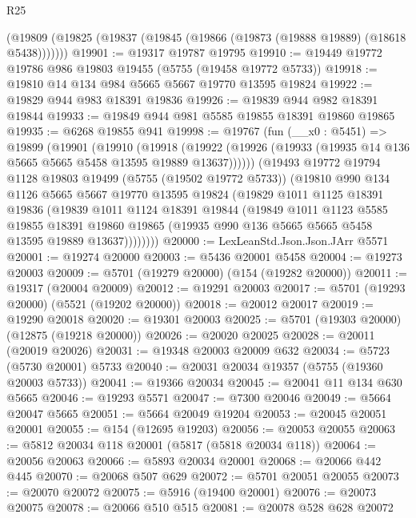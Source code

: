 \begin{lexlean}{R25}
\begin{coremodule}
    (@19809 (@19825 (@19837 (@19845 (@19866 (@19873 (@19888 @19889) (@18618 @5438)))))))
@19901 := @19317 @19787 @19795
@19910 := @19449 @19772 @19786 @986 @19803 @19455 (@5755 (@19458 @19772 @5733))
@19918 := @19810 @14 @134 @984 @5665 @5667 @19770 @13595 @19824
@19922 := @19829 @944 @983 @18391 @19836
@19926 := @19839 @944 @982 @18391 @19844
@19933 := @19849 @944 @981 @5585 @19855 @18391 @19860 @19865
@19935 := @6268 @19855 @941
@19998 := @19767
    (fun (__x0 : @5451) =>
    @19899
      (@19901
        (@19910
          (@19918
            (@19922 (@19926 (@19933 (@19935 @14 @136 @5665 @5665 @5458 @13595 @19889 @13637))))))
        (@19493
          @19772
          @19794
          @1128
          @19803
          @19499
          (@5755 (@19502 @19772 @5733))
          (@19810
            @990
            @134
            @1126
            @5665
            @5667
            @19770
            @13595
            @19824
            (@19829
              @1011
              @1125
              @18391
              @19836
              (@19839
                @1011
                @1124
                @18391
                @19844
                (@19849
                  @1011
                  @1123
                  @5585
                  @19855
                  @18391
                  @19860
                  @19865
                  (@19935 @990 @136 @5665 @5665 @5458 @13595 @19889 @13637))))))))
@20000 := LexLeanStd.Json.Json.JArr @5571
@20001 := @19274 @20000
@20003 := @5436 @20001 @5458
@20004 := @19273 @20003
@20009 := @5701 (@19279 @20000) (@154 (@19282 @20000))
@20011 := @19317 (@20004 @20009)
@20012 := @19291 @20003
@20017 := @5701 (@19293 @20000) (@5521 (@19202 @20000))
@20018 := @20012 @20017
@20019 := @19290 @20018
@20020 := @19301 @20003
@20025 := @5701 (@19303 @20000) (@12875 (@19218 @20000))
@20026 := @20020 @20025
@20028 := @20011 (@20019 @20026)
@20031 := @19348 @20003 @20009 @632
@20034 := @5723 (@5730 @20001) @5733
@20040 := @20031 @20034 @19357 (@5755 (@19360 @20003 @5733))
@20041 := @19366 @20034
@20045 := @20041 @11 @134 @630 @5665
@20046 := @19293 @5571
@20047 := @7300 @20046
@20049 := @5664 @20047 @5665
@20051 := @5664 @20049 @19204
@20053 := @20045 @20051 @20001
@20055 := @154 (@12695 @19203)
@20056 := @20053 @20055
@20063 := @5812 @20034 @118 @20001 (@5817 (@5818 @20034 @118))
@20064 := @20056 @20063
@20066 := @5893 @20034 @20001
@20068 := @20066 @442 @445
@20070 := @20068 @507 @629
@20072 := @5701 @20051 @20055
@20073 := @20070 @20072
@20075 := @5916 (@19400 @20001)
@20076 := @20073 @20075
@20078 := @20066 @510 @515
@20081 := @20078 @528 @628 @20072

\end{coremodule}
\end{lexlean}

